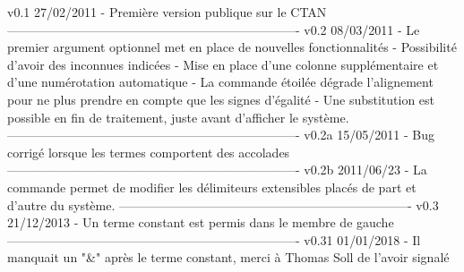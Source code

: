 v0.1        27/02/2011
	- Premi\`ere version publique sur le CTAN
----------------------------------------------------------------------
v0.2        08/03/2011
    - Le premier argument optionnel met en place de nouvelles
      fonctionnalit\'es
    - Possibilit\'e d'avoir des inconnues indic\'ees
    - Mise en place d'une colonne suppl\'ementaire et d'une
      num\'erotation automatique
    - La commande \'etoil\'ee \systeme* d\'egrade l'alignement pour ne
      plus prendre en compte que les signes d'\'egalit\'e
    - Une substitution est possible en fin de traitement, juste
      avant d'afficher le syst\`eme.
----------------------------------------------------------------------
v0.2a       15/05/2011
    - Bug corrig\'e lorsque les termes comportent des accolades
----------------------------------------------------------------------
v0.2b       2011/06/23
    - La commande \setdelim permet de modifier les d\'elimiteurs
      extensibles plac\'es de part et d'autre du syst\`eme.
----------------------------------------------------------------------
v0.3        21/12/2013
    - Un terme constant est permis dans le membre de gauche
    ----------------------------------------------------------------------
v0.31       01/01/2018
    - Il manquait un "&" apr\`es le terme constant, merci \`a Thomas Soll
      de l'avoir signal\'e